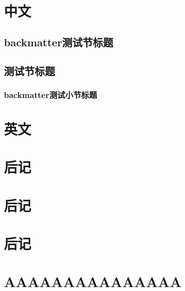 \documentclass[color=green]{textbook-cn}%
\begin{document}
\begin{Appendix}

\chapter[PPPPPLLL]{中文}
\thepart\zhlipsum

\section{backmatter测试节标题}
\section{测试节标题}

\subsection{backmatter测试小节标题}


\begin{Definition}[定义名称]
	\lipsum[2]
\end{Definition}




\chapter{英文}
\zhlipsum
\end{Appendix}



\chapter{后记}
\thechapter
\zhlipsum\zhlipsum


\begin{Definition}[定义名称]
	\lipsum[1]
\end{Definition}




\chapter[我爱你]{后记}
\thechapter
\zhlipsum\zhlipsum
\chapter*{后记}



\chapter*[我讨厌你]{AAAAAAAAAAAAAAA}
\zhlipsum\zhlipsum
\end{document}
